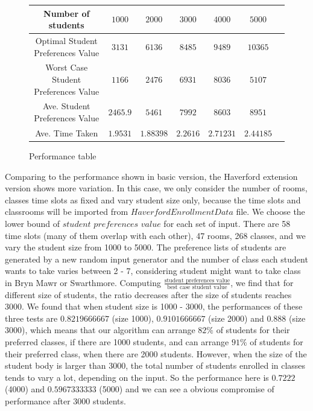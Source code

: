\documentclass[11pt, oneside]{article}   	%
\begin{document}
\begin{figure}[H]
\centering
\begin{tabular}{ |c||c|c|c|c|c|c| } 
 \hline
 Number of students & $1000$  & $2000$ & $3000$ & $4000$ & $5000$\\ 
  \hline \hline 
 Optimal Student Preferences Value & $3131$ & $6136$  & $8485$ & $9489$ & $10365$ \\
  \hline
Worst Case Student Preferences Value& $1166$ & $2476$ & $6931$ & $8036$ & $5107$ \\ 
 \hline
Ave. Student Preferences Value& $2465.9$ & $5461$ & $7992$ & $8603$ & $8951$ \\
 \hline
 Ave. Time Taken & $1.9531$ & $1.88398$ & $2.2616$ & $2.71231$ & $2.44185$ \\
 \hline
\end{tabular}
\caption{Performance table}
\end{figure}
Comparing to the performance shown in basic version, the Haverford extension version shows more variation. In this case, we only consider the number of rooms, classes time slots as fixed and vary student size only, because the time slots and classrooms will be imported from $HaverfordEnrollmentData$ file. We choose the lower bound of $student$ $preferences$ $value$ for each set of input. There are 58 time slots (many of them overlap with each other), 47 rooms, 268 classes, and we vary the student size from 1000 to 5000. The preference lists of students are generated by a new random input generator and the number of class each student wants to take varies between 2 - 7, considering student might want to take class in Bryn Mawr or Swarthmore. Computing $\frac{\text{student preferences value}}{\text{best case student value}}$, we find that for different size of students, the ratio decreases after the size of students reaches 3000. We found that when student size is 1000 - 3000, the performances of these three tests are $0.8219666667$ (size 1000), $0.9101666667$ (size 2000) and $0.888$ (size 3000), which means that our algorithm can arrange $82\%$ of students for their preferred classes, if there are 1000 students, and can arrange $91\%$ of students for their preferred class, when there are 2000 students. However, when the size of the student body is larger than $3000$, the total number of students enrolled in classes tends to vary a lot, depending on the input. So the performance here is $0.7222$ (4000) and $0.5967333333$ (5000) and we can see a obvious compromise of performance after 3000 students.
\end{document}
